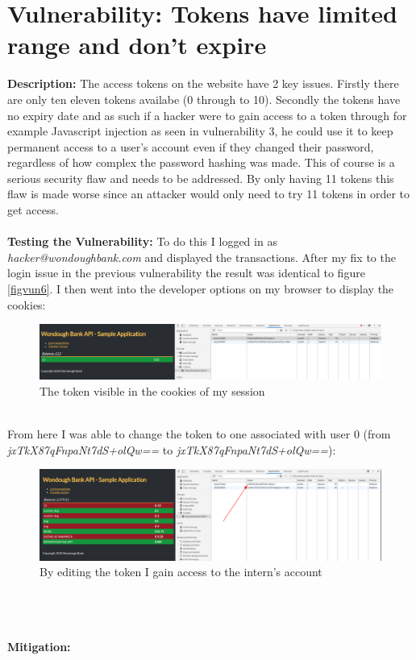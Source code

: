 \section{Vulnerability: Tokens have limited range and don't expire}
\label{sec:background}
\textbf{Description:} The access tokens on the website have 2 key issues. Firstly there are only ten eleven tokens availabe (0 through to 10). Secondly the tokens have no expiry
date and as such if a hacker were to gain access to a token through for example Javascript injection as seen in vulnerability 3, he could use it to keep permanent access to a
user's account even if they changed their password, regardless of how complex the password hashing was made. This of course is a serious security flaw and needs to be addressed.
By only having 11 tokens this flaw is made worse since an attacker would only need to try 11 tokens in order to get access. \\ \\
\textbf{Testing the Vulnerability:} To do this I logged in as \textit{hacker@wondoughbank.com} and displayed the transactions. After my fix to the login issue in the previous
vulnerability the result was identical to figure \ref{figvun6}. I then went into the developer options on my browser to display the cookies:
\begin{figure}[h]
    \centering
    \includegraphics[width=1\textwidth]{figs/7.1.png}
    \caption{The token visible in the cookies of my session}
    \label{7.1}
\end{figure}\\
From here I was able to change the token to one associated with user 0 (from \textit{jxTkX87qFnpaNt7dS+olQw==} to \textit{jxTkX87qFnpaNt7dS+olQw==}):
\begin{figure}[h]
    \centering
    \includegraphics[width=1\textwidth]{figs/7.2.png}
    \caption{By editing the token I gain access to the intern's account}
    \label{7.2}
\end{figure}\\

\\ \\
\textbf{Mitigation:} 